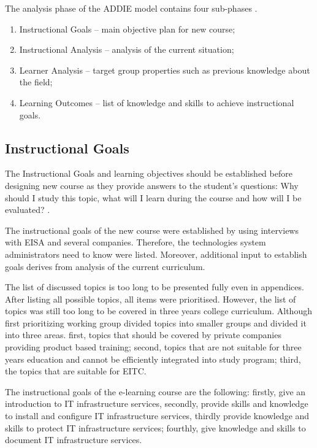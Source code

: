 The analysis phase of the \gls{ADDIE} model contains four sub-phases \citep{website:addie}.
\begin{enumerate}
\item Instructional Goals -- main objective plan for new course;
\item Instructional Analysis -- analysis of the current situation;
\item Learner Analysis -- target group properties such as previous knowledge about the field;
\item Learning Outcomes -- list of knowledge and skills to achieve instructional goals.
\end{enumerate}


\subsection{Instructional Goals}
The Instructional Goals and learning objectives should be established before designing new course as they provide answers to the student’s questions: Why should I study this topic, what will I learn during the course and how will I be evaluated? \citep{website:addie}.


The instructional goals of the new course were established by using interviews with \gls{EISA} and several companies. Therefore, the technologies system administrators need to know were listed.  Moreover, additional input to establish goals derives from analysis of the current curriculum.

The list of discussed topics is too  long to be presented fully even in appendices. After listing all possible topics, all items were prioritised. However, the list of topics was still too long to  be covered in three years college curriculum. Although first prioritizing working group divided topics into smaller groups and divided it into three areas. first, topics that should be covered by private companies providing product based training; second, topics that are not suitable for three years education and cannot be efficiently integrated into study program; third, the topics that are suitable for \gls{EITC}.

The instructional goals of the e-learning course are the following: firstly, give an introduction to IT infrastructure services, secondly, provide skills and knowledge to install and configure IT infrastructure services, thirdly provide knowledge and skills to protect IT infrastructure services; fourthly, give knowledge and skills to document IT infrastructure services.

